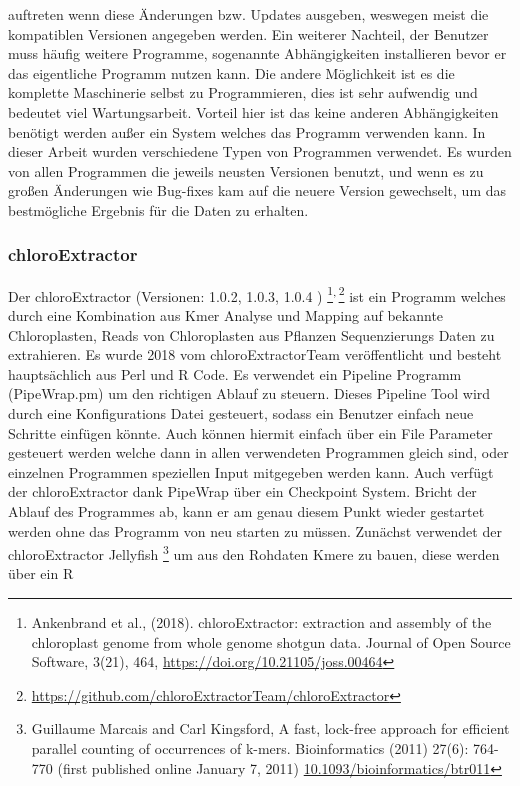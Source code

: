 \documentclass{scrartcl}
\begin{document}
auftreten wenn diese Änderungen bzw. Updates ausgeben, weswegen meist die kompatiblen Versionen angegeben werden. Ein weiterer Nachteil, der Benutzer muss häufig weitere Programme, sogenannte Abhängigkeiten installieren
bevor er das eigentliche Programm nutzen kann. Die andere Möglichkeit ist es die komplette Maschinerie selbst zu Programmieren, dies ist sehr aufwendig und bedeutet viel Wartungsarbeit. Vorteil hier
ist das keine anderen Abhängigkeiten benötigt werden außer ein System welches das Programm verwenden kann. In dieser Arbeit wurden verschiedene Typen von Programmen verwendet.
Es wurden von allen Programmen die jeweils neusten Versionen benutzt, und wenn es zu großen Änderungen wie Bug-fixes kam auf die neuere Version gewechselt, um das bestmögliche Ergebnis für die Daten
zu erhalten.
\subsubsection{chloroExtractor}
\label{sec-1-5-1}
Der chloroExtractor (Versionen: 1.0.2, 1.0.3, 1.0.4 ) \footnote{Ankenbrand et al., (2018). chloroExtractor: extraction and assembly of the chloroplast genome from whole genome shotgun data. Journal of Open Source Software, 3(21), 464, \url{https://doi.org/10.21105/joss.00464}}\textsuperscript{,}\,\footnote{\url{https://github.com/chloroExtractorTeam/chloroExtractor}} ist ein Programm welches durch eine Kombination aus Kmer Analyse und Mapping auf bekannte Chloroplasten, Reads von Chloroplasten aus Pflanzen Sequenzierungs Daten
zu extrahieren. Es wurde 2018 vom chloroExtractorTeam veröffentlicht \footnotemark[9]{} und besteht hauptsächlich aus Perl und R Code. Es verwendet ein Pipeline Programm (PipeWrap.pm) um den richtigen Ablauf zu steuern.
Dieses Pipeline Tool wird durch eine Konfigurations Datei gesteuert, sodass ein Benutzer einfach neue Schritte einfügen könnte. Auch können hiermit einfach über ein File Parameter gesteuert werden welche dann in 
allen verwendeten Programmen gleich sind, oder einzelnen Programmen speziellen Input mitgegeben werden kann. Auch verfügt der chloroExtractor dank PipeWrap über ein Checkpoint System. Bricht der Ablauf des Programmes
ab, kann er am genau diesem Punkt wieder gestartet werden ohne das Programm von neu starten zu müssen. Zunächst verwendet der chloroExtractor Jellyfish \footnote{Guillaume Marcais and Carl Kingsford, A fast, lock-free approach for efficient parallel counting of occurrences of k-mers. Bioinformatics (2011) 27(6): 764-770 (first published online January 7, 2011) \url{10.1093/bioinformatics/btr011}} um aus den Rohdaten Kmere zu bauen, diese werden über ein R
\end{document}
